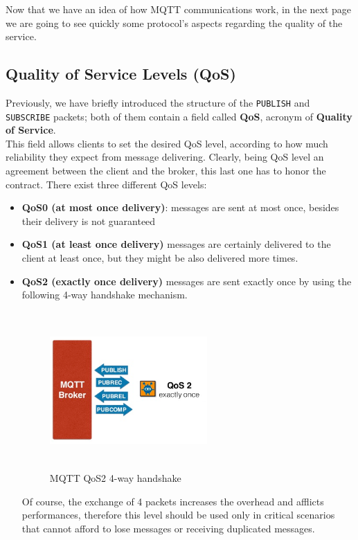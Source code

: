 \documentclass[12pt]{report}
\begin{document}
{\setlength{\parindent}{0cm}
Now that we have an idea of how MQTT communications work, in the next page we are going to see quickly some protocol's aspects regarding the quality of the service.
}

\clearpage

\subsection{Quality of Service Levels (QoS)}

\bigskip
Previously, we have briefly introduced the structure of the \texttt{PUBLISH} and \texttt{SUBSCRIBE} packets; both of them contain a field called \textbf{QoS}, acronym of \textbf{Quality of Service}.\\
This field allows clients to set the desired QoS level, according to how much reliability they expect from message delivering.
Clearly, being QoS level an agreement between the client and the broker, this last one has to honor the contract.
There exist three different QoS levels:

\begin{itemize}
\setlength{\itemindent}{+4mm}
\item \textbf{QoS0 (at most once delivery)}: messages are sent at most once, besides their delivery is not guaranteed
\item \textbf{QoS1 (at least once delivery)} messages are certainly delivered to the client at least once, but they might be also delivered more times.
\item \textbf{QoS2 (exactly once delivery)} messages are sent exactly once by using the following 4-way handshake mechanism.

\begin{figure}[H]
\includegraphics[width=6cm,height=6cm,keepaspectratio]{mqtt_qos2}
\centering
\caption{MQTT QoS2 4-way handshake}
\end{figure}
Of course, the exchange of 4 packets increases the overhead and afflicts performances, therefore this level should be used only in critical scenarios that cannot afford to lose messages or receiving duplicated messages.\\

\end{itemize}
\end{document}
